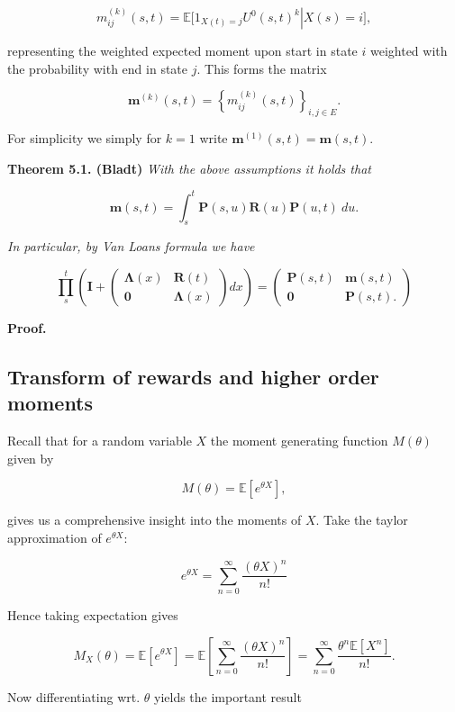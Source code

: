 \documentclass[
]{book}
\begin{document}
\[
m_{ij}^{(k)}(s,t)=\mathbb E\left.\Big[1_{X(t)=j}U^0(s,t)^k\right\vert X(s)=i\Big],
\]

representing the weighted expected moment upon start in state \(i\) weighted with the probability with end in state \(j\). This forms the matrix

\[
\mathbf m^{(k)}(s,t)=\left\{m_{ij}^{(k)}(s,t)\right\}_{i,j\in E}.
\]

For simplicity we simply for \(k=1\) write \(\mathbf m^{(1)}(s,t) = \mathbf m(s,t)\).

\textbf{Theorem 5.1. (Bladt)} \emph{With the above assumptions it holds that}

\[
\mathbf m(s,t)=\int_s^t\mathbf P(s,u)\mathbf R(u)\mathbf P(u,t)\ du.
\]

\emph{In particular, by Van Loans formula we have}

\[
\prod_s^t\left(\mathbf I + \begin{pmatrix}\mathbf \Lambda(x) & \mathbf R(t)\\ \mathbf 0 & \mathbf \Lambda(x)\end{pmatrix} dx\right)=
\begin{pmatrix}
\mathbf P(s,t) & \mathbf m(s,t)\\
\mathbf 0 & \mathbf P(s,t).
\end{pmatrix}
\]

\textbf{Proof.}

\hypertarget{transform-of-rewards-and-higher-order-moments}{%
\subsection{Transform of rewards and higher order moments}\label{transform-of-rewards-and-higher-order-moments}}

Recall that for a random variable \(X\) the moment generating function \(M(\theta)\) given by

\[
M(\theta)=\mathbb E[e^{\theta X}],
\]

gives us a comprehensive insight into the moments of \(X\). Take the taylor approximation of \(e^{\theta X}\):

\[
e^{\theta X}=\sum_{n=0}^\infty\frac{(\theta X)^n}{n!}
\]

Hence taking expectation gives

\[
M_X(\theta)=\mathbb E[e^{\theta X}]=\mathbb E\left[\sum_{n=0}^\infty\frac{(\theta X)^n}{n!}\right]=\sum_{n=0}^\infty\frac{\theta^n \mathbb E[X^n]}{n!}.
\]

Now differentiating wrt. \(\theta\) yields the important result
\end{document}
